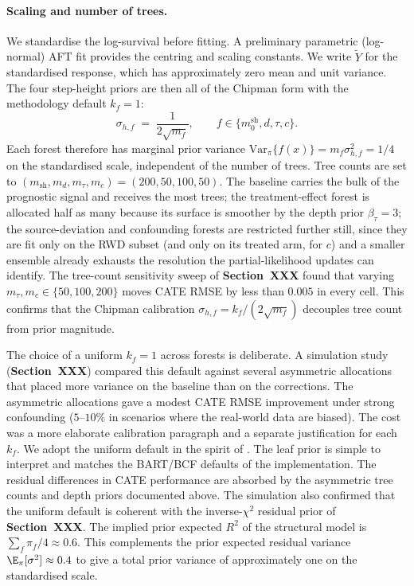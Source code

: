 \paragraph{Scaling and number of trees.}
We standardise the log-survival before fitting.
A preliminary parametric (log-normal) AFT fit provides the centring and scaling constants.
We write $\widetilde Y$ for the standardised response, which has approximately zero mean and unit variance.
The four step-height priors are then all of the Chipman form with the methodology default $k_f = 1$:
\begin{equation*}
  \sigma_{h,f} \;=\; \frac{1}{2\sqrt{m_f}}, \qquad f \in \{m_0^{\mathrm{sh}}, d, \tau, c\}.
\end{equation*}
Each forest therefore has marginal prior variance $\mathrm{Var}_\pi\{f(x)\} = m_f \sigma_{h,f}^2 = 1/4$ on the standardised scale, independent of the number of trees.
Tree counts are set to $(m_{\mathrm{sh}}, m_d, m_\tau, m_c) = (200, 50, 100, 50)$.
The baseline carries the bulk of the prognostic signal and receives the most trees; the treatment-effect forest is allocated half as many because its surface is smoother by the depth prior $\beta_\tau = 3$; the source-deviation and confounding forests are restricted further still, since they are fit only on the RWD subset (and only on its treated arm, for $c$) and a smaller ensemble already exhausts the resolution the partial-likelihood updates can identify.
The tree-count sensitivity sweep of \textbf{Section~XXX} found that varying $m_\tau, m_c \in \{50, 100, 200\}$ moves CATE RMSE by less than $0.005$ in every cell.
This confirms that the Chipman calibration $\sigma_{h,f} = k_f / (2\sqrt{m_f})$ decouples tree count from prior magnitude.

The choice of a uniform $k_f = 1$ across forests is deliberate.
A simulation study (\textbf{Section~XXX}) compared this default against several asymmetric allocations that placed more variance on the baseline than on the corrections.
The asymmetric allocations gave a modest CATE RMSE improvement under strong confounding ($5$--$10\%$ in scenarios where the real-world data are biased).
The cost was a more elaborate calibration paragraph and a separate justification for each $k_f$.
We adopt the uniform default in the spirit of \citet{chipman2010bart}.
The leaf prior is simple to interpret and matches the BART/BCF defaults of the implementation.
The residual differences in CATE performance are absorbed by the asymmetric tree counts and depth priors documented above.
The simulation also confirmed that the uniform default is coherent with the inverse-$\chi^2$ residual prior of \textbf{Section~XXX}.
The implied prior expected $R^2$ of the structural model is $\sum_f \pi_f / 4 \approx 0.6$.
This complements the prior expected residual variance $\E_\pi[\sigma^2] \approx 0.4$ to give a total prior variance of approximately one on the standardised scale.

